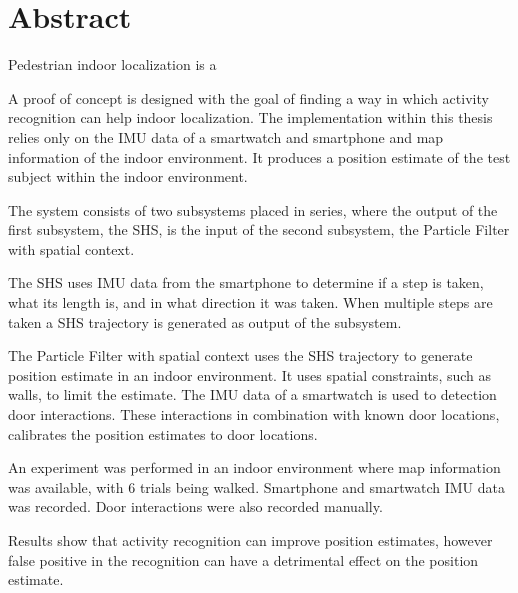%
\chapter*{Abstract}%

Pedestrian indoor localization is a 

A proof of concept is designed with the goal of finding a way in which activity recognition can help indoor localization.
The implementation within this thesis relies only on the \ac{IMU} data of a smartwatch and smartphone and map information of the indoor environment. It produces a position estimate of the test subject within the indoor environment. \par 

The system consists of two subsystems placed in series, where the output of the first subsystem, the \ac{SHS}, is the input of the second subsystem, the Particle Filter with  spatial context. \par 

The \ac{SHS} uses \ac{IMU} data from the smartphone to determine if a step is taken, what its length is, and in what direction it was taken. When multiple steps are taken a \ac{SHS} trajectory is generated as output of the subsystem. \par 

The Particle Filter with spatial context uses the \ac{SHS} trajectory to generate position estimate in an indoor environment. It uses spatial constraints, such as walls, to limit the estimate. The \ac{IMU} data of a smartwatch is used to detection door interactions. These interactions in combination with known door locations, calibrates the position estimates to door locations. 

An experiment was performed in an indoor environment where map information was available, with 6 trials being walked. Smartphone and smartwatch {IMU} data was recorded. Door interactions were also recorded manually.

Results show that activity recognition can improve position estimates, however false positive in the recognition can have a detrimental effect on the position estimate.

